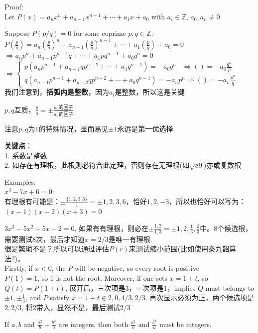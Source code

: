 \documentclass[../main.tex]{subfiles}
\begin{document}
Proof:\\
Let $P(x) = a_nx^n+a_{n-1}x^{n-1}+\cdots +a_1x+a_0$ with $a_i \in \mathbb{Z}$, $a_0,a_n \neq 0$

Suppose $P(p/q) = 0$ for some coprime $p,q \in \mathbb{Z}$:\\
$P(\frac{p}{q}) = a_{n}(\frac{p}{q})^{n} + a_{n-1}(\frac{p}{q})^{n-1}+\cdots + a_1(\frac{p}{q}) + a_{0} = 0$\\
$\Rightarrow a_{n}p^{n}+ a_{n-1}p^{n-1}q+\cdots +a_1pq^{n-1}+ a_{0}q^{n} = 0$\\
$\Rightarrow
  \begin{cases}
  p(a_{n}p^{n-1}+a_{n-1}qp^{n-2}+\cdots +a_1q^{n-1}) = -a_{0}q^{n} \;\;\; \Rightarrow ()=-a_{0}\frac{q^{n}}{p}\\
  q(a_{n-1}p^{n-1}+a_{n-2}qp^{n-2}+\cdots +a_{0}q^{n-1}) = -a_{n}p^{n} \Rightarrow ()=-a_{n}\frac{p^{n}}{q}
  \end{cases}
$\\
我们注意到，\textbf{括弧内是整数}，因为$a_{i}$是整数，所以这是关键

$p,q$互质，$\frac{p}{q} = \pm \frac{a_0\text{的因子}}{a_n\text{的因子}}$

注意$p, q$为$1$的特殊情况，显而易见$\pm 1$永远是第一优选择

\textbf{关键点}：\\
1. 系数是整数\\
2. 如存在有理根，此根则必符合此定理，否则存在无理根(如$\sqrt{89}$)亦或复数根

Examples:\\
$x^3-7x+6=0$: \\
有理根有可能是：$\pm \frac{\{1,2,3,6\}}{1}=\pm {1, 2, 3, 6}$，恰好$1, 2, -3$，所以也恰好可以写为：$(x-1)(x-2)(x+3)=0$

$3x^3-5x^2+5x-2=0$, 如果有有理根，则必在$\pm \frac{1,2}{1,3}=\pm{1,2, \frac{1}{3}, \frac{2}{3}}$中。8个候选根，需要测试8次，最后才知道$x=2/3$是唯一有理根.\\
很是繁琐不是？所以可以通过评估$P(r)$来测试缩小范围(比如使用秦九韶算法?)。\\
Firstly, if $x<0$, the $P$ will be negative, so every root is positive\\
$P(1)=1$, so 1 is not the root. Moreover, if one sets $x=1+t$, so $Q(t)=P(1+t)$, 展开后，三次项是3，一次项是1，implies $Q$ must belongs to ${\pm 1, \pm \frac{1}{3}}$, and $P$ satisfy $x=1+t \in {2,0,4/3,2/3}$. 再次显示必须为正，两个候选项是$2, 2/3$, 将$2$带入，显然不是，最后测试$2/3$\

If $a, b$ and $\frac{a^2}{b}+\frac{b^2}{a}$ are integers, then both $\frac{a^2}{b}$ and $\frac{b^2}{a}$ must be integers.
\end{document}
